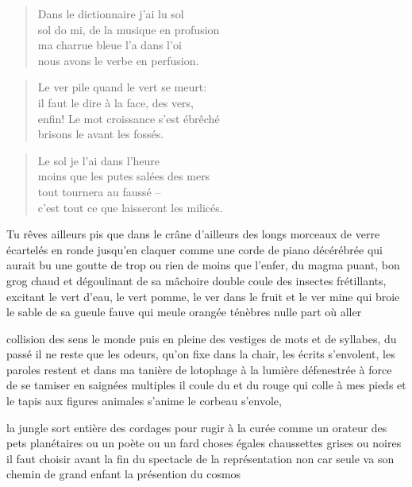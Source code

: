   \begin{verse}
    Dans le dictionnaire j’ai lu sol\\
    sol do mi, de la musique en profusion\\
    ma charrue bleue l’a dans l’oi\\
    nous avons le verbe en perfusion.
  \end{verse}
  \begin{verse}
    Le ver pile quand le vert se meurt:\\
    il faut le dire à la face, des vers,\\
    enfin! Le mot croissance s’est ébrêché\\
    brisons le avant les fossés.
  \end{verse}
  \begin{verse}
    Le sol je l’ai dans l’heure\\
    moins que les putes salées des mers\\
    tout tournera au faussé --\\
    c’est tout ce que laisseront les milicés.
  \end{verse}

  Tu rêves ailleurs pis que dans  le crâne d’ailleurs des longs morceaux de
  verre  écartelés en  ronde  jusqu’en  claquer comme  une  corde de  piano
  décérébrée  qui  aurait bu  une  goutte  de trop  ou  rien  de moins  que
  l’enfer, du  magma puant, bon  grog chaud  et dégoulinant de  sa mâchoire
  double coule  des insectes  frétillants, excitant le  vert d’eau,  le vert
  pomme, le ver  dans le fruit et le  ver mine qui broie le sable  de sa gueule
  fauve qui meule orangée ténèbres  nulle part où aller

  collision des sens  le monde puis en pleine   des vestiges de mots
  et de syllabes,  du passé il ne  reste que les odeurs, qu’on  fixe dans la
  chair, les écrits  s’envolent, les paroles restent et dans  ma tanière de
  lotophage à  la lumière défenestrée à  force de se tamiser  en saignées
  multiples il coule  du  et du  rouge qui colle à mes  pieds et le
  tapis aux figures animales s’anime le corbeau s’envole,

  la jungle sort entière des cordages pour rugir à la curée comme un orateur
  des  pets  planétaires ou  un  poète  ou  un fard  choses  égales
  chaussettes  grises ou  noires  il faut  choisir avant  la  fin du  spectacle
  de  la  représentation non  car  seule  va son  chemin  de  grand enfant  la
  présention du cosmos

